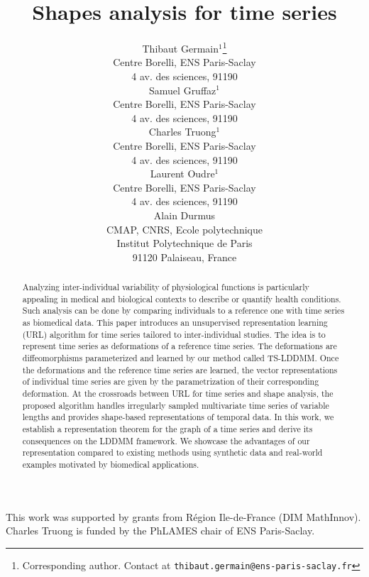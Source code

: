 \documentclass{article}
\title{Shapes analysis for time series}
\author{%
  Thibaut Germain$^1$\thanks{Corresponding author. Contact at \texttt{thibaut.germain@ens-paris-saclay.fr}}\\
  Centre Borelli, ENS Paris-Saclay\\
  4 av. des sciences, 91190 \\
  \And
  Samuel Gruffaz$^1$\\
  Centre Borelli, ENS Paris-Saclay\\
  4 av. des sciences, 91190 \\
  \AND
  Charles Truong$^1$\\
  Centre Borelli, ENS Paris-Saclay\\
  4 av. des sciences, 91190 \\
  \And
  Laurent Oudre$^1$\\
  Centre Borelli, ENS Paris-Saclay\\
  4 av. des sciences, 91190 \\
  \And
  Alain Durmus \\
  CMAP, CNRS, Ecole polytechnique\\
  Institut Polytechnique de Paris\\
  91120 Palaiseau, France \\
}
\begin{document}
\maketitle

\begin{abstract}
Analyzing inter-individual variability of physiological functions is particularly appealing in medical and biological contexts to describe or quantify health conditions. Such analysis can be done by comparing individuals to a reference one with time series as biomedical data.
This paper introduces an unsupervised representation learning (URL) algorithm for time series tailored to inter-individual studies. The idea is to represent time series as deformations of a reference time series. The deformations are diffeomorphisms parameterized and learned by our method called TS-LDDMM. Once the deformations and the reference time series are learned, the vector representations of individual time series are given by the parametrization of their corresponding deformation. At the crossroads between URL for time series and shape analysis, the proposed algorithm handles irregularly sampled multivariate time series of variable lengths and provides shape-based representations of temporal data.
In this work, we establish a representation theorem for the graph of a time series and derive its consequences on the LDDMM framework. We showcase the advantages of our representation compared to existing methods using synthetic data and real-world examples motivated by biomedical applications.
\end{abstract}






\begin{ack}
This work was supported by grants from Région Ile-de-France (DIM MathInnov).
Charles Truong is funded by the PhLAMES chair of ENS Paris-Saclay.
\end{ack}




\newpage


\appendix




\end{document}
